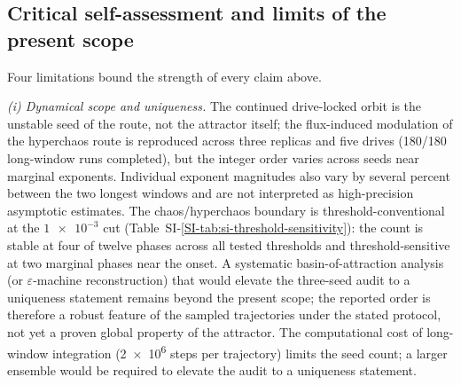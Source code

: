 \documentclass[Phys]{SciPost}
\begin{document}
\subsection{Critical self-assessment and limits of the present scope}
\label{sec:limits}

Four limitations bound the strength of every claim above.

\emph{(i) Dynamical scope and uniqueness.} The continued drive-locked orbit is the unstable seed of the route, not the attractor itself; the flux-induced modulation of the hyperchaos route is reproduced across three replicas and five drives (180/180 long-window runs completed), but the integer order varies across seeds near marginal exponents. Individual exponent magnitudes also vary by several percent between the two longest windows and are not interpreted as high-precision asymptotic estimates. The chaos/hyperchaos boundary is threshold-conventional at the $\num{1e-3}$ cut (Table~SI-\ref{SI-tab:si-threshold-sensitivity}): the count is stable at four of twelve phases across all tested thresholds and threshold-sensitive at two marginal phases near the onset. A systematic basin-of-attraction analysis (or $\varepsilon$-machine reconstruction) that would elevate the three-seed audit to a uniqueness statement remains beyond the present scope; the reported order is therefore a robust feature of the sampled trajectories under the stated protocol, not yet a proven global property of the attractor. The computational cost of long-window integration (\num{2e6} steps per trajectory) limits the seed count; a larger ensemble would be required to elevate the audit to a uniqueness statement.
\end{document}

